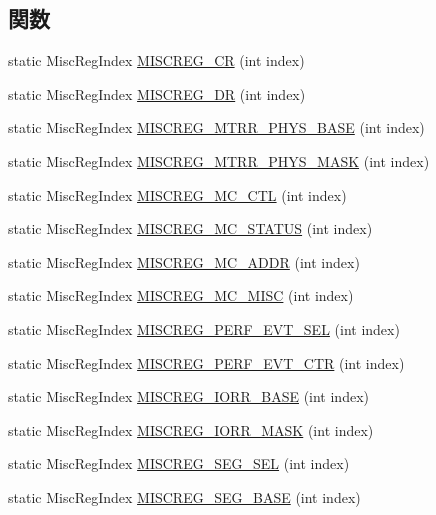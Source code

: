 \subsection*{関数}
\begin{DoxyCompactItemize}
\item 
static MiscRegIndex \hyperlink{namespaceX86ISA_a1d9390d2a9b1492e2f14c97e2db2ceed}{MISCREG\_\-CR} (int index)
\item 
static MiscRegIndex \hyperlink{namespaceX86ISA_ac1e3294c84d21bbaf4bd955237fd8e19}{MISCREG\_\-DR} (int index)
\item 
static MiscRegIndex \hyperlink{namespaceX86ISA_a4376444d0ecbbff164d82b2e8a65471c}{MISCREG\_\-MTRR\_\-PHYS\_\-BASE} (int index)
\item 
static MiscRegIndex \hyperlink{namespaceX86ISA_a181eaf0dd78921a606c1727c0ea17e0d}{MISCREG\_\-MTRR\_\-PHYS\_\-MASK} (int index)
\item 
static MiscRegIndex \hyperlink{namespaceX86ISA_ada6bc06a550215bc7c4b09d9d1f747e5}{MISCREG\_\-MC\_\-CTL} (int index)
\item 
static MiscRegIndex \hyperlink{namespaceX86ISA_a788a5d14812b79f5e74448195f953858}{MISCREG\_\-MC\_\-STATUS} (int index)
\item 
static MiscRegIndex \hyperlink{namespaceX86ISA_aec4e5e9a0054e6f569f57a147949262d}{MISCREG\_\-MC\_\-ADDR} (int index)
\item 
static MiscRegIndex \hyperlink{namespaceX86ISA_a50504e1ffcb068568a0d815d5e2c3c48}{MISCREG\_\-MC\_\-MISC} (int index)
\item 
static MiscRegIndex \hyperlink{namespaceX86ISA_a7808596c37e2fec948e85a3c612cd3b7}{MISCREG\_\-PERF\_\-EVT\_\-SEL} (int index)
\item 
static MiscRegIndex \hyperlink{namespaceX86ISA_adf79cb6816cce0adf35b8b7808facc44}{MISCREG\_\-PERF\_\-EVT\_\-CTR} (int index)
\item 
static MiscRegIndex \hyperlink{namespaceX86ISA_ae947cc3d36a3597e5396c8b7824d2b2b}{MISCREG\_\-IORR\_\-BASE} (int index)
\item 
static MiscRegIndex \hyperlink{namespaceX86ISA_af40958c001ad1b78bdd1174e2964d26a}{MISCREG\_\-IORR\_\-MASK} (int index)
\item 
static MiscRegIndex \hyperlink{namespaceX86ISA_a7a287359d6688cb50477df97dcbdd196}{MISCREG\_\-SEG\_\-SEL} (int index)
\item 
static MiscRegIndex \hyperlink{namespaceX86ISA_a310d36d3d8ec55a84d807cb7e1edf7d6}{MISCREG\_\-SEG\_\-BASE} (int index)
\item 

\end{DoxyCompactItemize}
